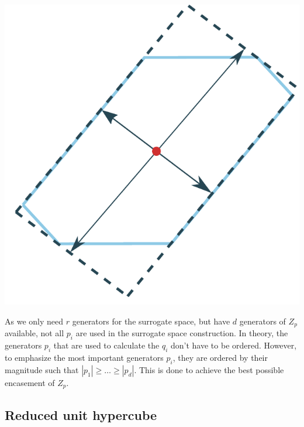 \documentclass[
  a4paper,  %
  twoside,  %
  bibliography=totoc,
  headsepline,
  cleardoublepage=empty,
  parskip=half,
  draft=false
]{scrbook}
\begin{document}
\begin{mdframed}[style=style]
        \centering
\begin{minipage}{.49\textwidth}
        \centering
  \label{fig:surrogate_space}
    \end{minipage}%
    \begin{minipage}{0.49\textwidth}
        \centering
        \vspace{3.5mm}
  \includegraphics[width=0.8\linewidth]{graphics/surrogate_space}
  \hspace{-5.5mm}
    \end{minipage}
\end{mdframed}
%
As we only need $r$ generators for the surrogate space, but have $d$ generators of $Z_p$ available, not all $p_i$ are used in the surrogate space construction.
In theory, the generators $p_i$ that are used to calculate the $q_i$ don't have to be ordered.
However, to emphasize the most important generators $p_i$, they are ordered by their magnitude such that $|p_1|\geq \dots \geq |p_d|$.
This is done to achieve the best possible encasement of $Z_p$.

\subsection{Reduced unit hypercube}
\end{document}
